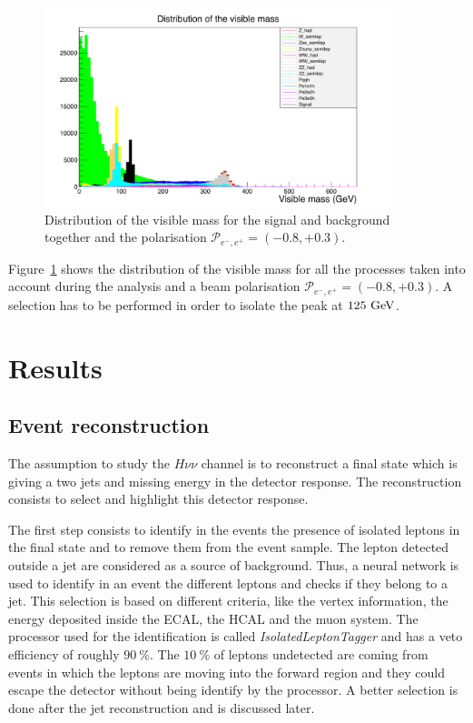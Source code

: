     \begin{figure}[!h]
      \centering
      \includegraphics[width = 0.9\textwidth]{Pictures/Higgs/mVis_all.png}
      \caption{Distribution of the visible mass for the signal and background together and the polarisation $\mathcal{P}_{e^-,e^+} = (-0.8,+0.3)$.}
      \label{fig:mVisAll}
    \end{figure}

    Figure~\ref{fig:mVisAll} shows the distribution of the visible mass for all the processes taken into account during the analysis and a beam polarisation $\mathcal{P}_{e^-,e^+} = (-0.8,+0.3)$.
    A selection has to be performed in order to isolate the peak at $125~\rm{GeV}$.

  \section{Results}
 
    \subsection{Event reconstruction}

    The assumption to study the $H \nu\nu$ channel is to reconstruct a final state which is giving a two jets and missing energy in the detector response.
    The reconstruction consists to select and highlight this detector response.

    The first step consists to identify in the events the presence of isolated leptons in the final state and to remove them from the event sample.
    The lepton detected outside a jet are considered as a source of background.
    Thus, a neural network is used to identify in an event the different leptons and checks if they belong to a jet.
    This selection is based on different criteria, like the vertex information, the energy deposited inside the \gls{ECAL}, the \gls{HCAL} and the muon system. 
    The processor used for the identification is called \textit{IsolatedLeptonTagger} and has a veto efficiency of roughly $90~\%$.
    The $10~\%$ of leptons undetected are coming from events in which the leptons are moving into the forward region and they could escape the detector without being identify by the processor.
    A better selection is done after the jet reconstruction and is discussed later.

